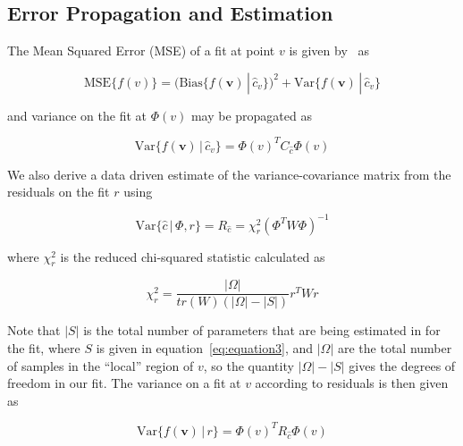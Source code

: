 \subsection{Error Propagation and Estimation}\label{subsec:errors}

The Mean Squared Error (MSE) of a fit at point $v$ is given by~\citet{Fan96b}
as

\begin{equation}
    \text{MSE}\{f(v)\} = (\text{Bias}\{f(\bm{v})\, |\, \hat{c}_v \})^2 +
                          \text{Var}\{f(\bm{v})\, |\, \hat{c}_v \}
    \label{eq:equation20}
\end{equation}

and variance on the fit at $\Phi(v)$ may be propagated as

\begin{equation}
    \text{Var}\{f(\bm{v})\, |\, \hat{c}_v \} = \Phi(v)^T C_{\hat{c}} \Phi(v)
    \label{eq:equation24}
\end{equation}

We also derive a data driven estimate of the variance-covariance matrix from
the residuals on the fit $r$ using

\begin{equation}
    \text{Var}\{ \hat{c}\, |\, \Phi, r \} = R_{\hat{c}} =
        \chi_r^2 (\Phi^T W \Phi)^{-1}
    \label{eq:equation22}
\end{equation}

where $\chi_r^2$ is the reduced chi-squared statistic calculated as

\begin{equation}
    \chi_r^2 = \frac{|\Omega|}{tr(W)(|\Omega| - |S|)} r^T W r
    \label{eq:equation75}
\end{equation}

Note that $|S|$ is the total number of parameters that are being estimated in
for the fit, where $S$ is given in equation~\ref{eq:equation3}, and $|\Omega|$
are the total number of samples in the ``local'' region of $v$, so the quantity
$|\Omega| - |S|$ gives the degrees of freedom in our fit.
The variance on a fit at $v$ according to residuals is then given as

\begin{equation}
    \text{Var}\{f(\bm{v})\, |\, r\} = \Phi(v)^T R_{\hat{c}} \Phi(v)
    \label{eq:equation76}
\end{equation}
